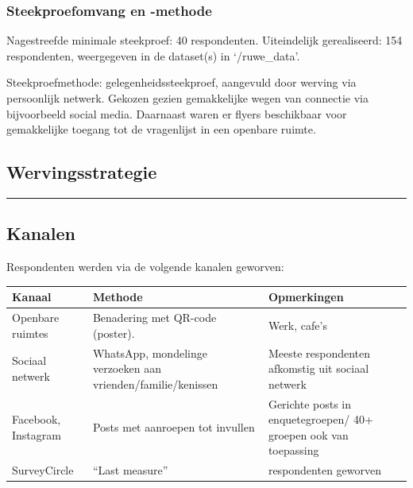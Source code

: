 \documentclass[
]{article}
\newcounter{none} %
\begin{document}
\subsubsection{Steekproefomvang en
-methode}\label{steekproefomvang-en--methode}

Nagestreefde minimale steekproef: 40 respondenten. Uiteindelijk
gerealiseerd: 154 respondenten, weergegeven in de dataset(s) in
`/ruwe\_data'.

Steekproefmethode: gelegenheidssteekproef, aangevuld door werving via
persoonlijk netwerk. Gekozen gezien gemakkelijke wegen van connectie via
bijvoorbeeld social media. Daarnaast waren er flyers beschikbaar voor
gemakkelijke toegang tot de vragenlijst in een openbare ruimte.

\subsection{Wervingsstrategie}\label{wervingsstrategie}

\begin{center}\rule{0.5\linewidth}{0.5pt}\end{center}

\subsection{Kanalen}\label{kanalen}

Respondenten werden via de volgende kanalen geworven:

{\def\LTcaptype{none} %
\begin{longtable}[]{@{}
  >{\raggedright\arraybackslash}p{}
  >{\raggedright\arraybackslash}p{}
  >{\raggedright\arraybackslash}p{}@{}}
\toprule\noalign{}
\begin{minipage}[b]{\linewidth}\raggedright
Kanaal
\end{minipage} & \begin{minipage}[b]{\linewidth}\raggedright
Methode
\end{minipage} & \begin{minipage}[b]{\linewidth}\raggedright
Opmerkingen
\end{minipage} \\
\midrule\noalign{}
\endhead
\bottomrule\noalign{}
\endlastfoot
Openbare ruimtes & Benadering met QR-code (poster). & Werk, cafe's \\
Sociaal netwerk & WhatsApp, mondelinge verzoeken aan
vrienden/familie/kenissen & Meeste respondenten afkomstig uit sociaal
netwerk \\
Facebook, Instagram & Posts met aanroepen tot invullen & Gerichte posts
in enquetegroepen/ 40+ groepen ook van toepassing \\
SurveyCircle & ``Last measure'' & 0 respondenten geworven \\
\end{longtable}
}
\end{document}
